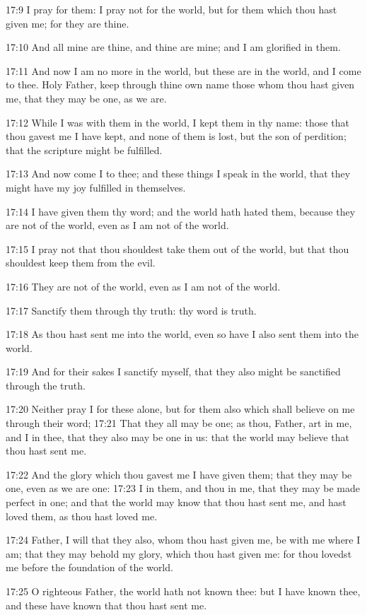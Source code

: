 17:9 I pray for them: I pray not for the world, but for them which
thou hast given me; for they are thine.

17:10 And all mine are thine, and thine are mine; and I am glorified
in them.

17:11 And now I am no more in the world, but these are in the world,
and I come to thee. Holy Father, keep through thine own name those
whom thou hast given me, that they may be one, as we are.

17:12 While I was with them in the world, I kept them in thy name:
those that thou gavest me I have kept, and none of them is lost, but
the son of perdition; that the scripture might be fulfilled.

17:13 And now come I to thee; and these things I speak in the world,
that they might have my joy fulfilled in themselves.

17:14 I have given them thy word; and the world hath hated them,
because they are not of the world, even as I am not of the world.

17:15 I pray not that thou shouldest take them out of the world, but
that thou shouldest keep them from the evil.

17:16 They are not of the world, even as I am not of the world.

17:17 Sanctify them through thy truth: thy word is truth.

17:18 As thou hast sent me into the world, even so have I also sent
them into the world.

17:19 And for their sakes I sanctify myself, that they also might be
sanctified through the truth.

17:20 Neither pray I for these alone, but for them also which shall
believe on me through their word; 17:21 That they all may be one; as
thou, Father, art in me, and I in thee, that they also may be one in
us: that the world may believe that thou hast sent me.

17:22 And the glory which thou gavest me I have given them; that they
may be one, even as we are one: 17:23 I in them, and thou in me, that
they may be made perfect in one; and that the world may know that thou
hast sent me, and hast loved them, as thou hast loved me.

17:24 Father, I will that they also, whom thou hast given me, be with
me where I am; that they may behold my glory, which thou hast given
me: for thou lovedst me before the foundation of the world.

17:25 O righteous Father, the world hath not known thee: but I have
known thee, and these have known that thou hast sent me.


